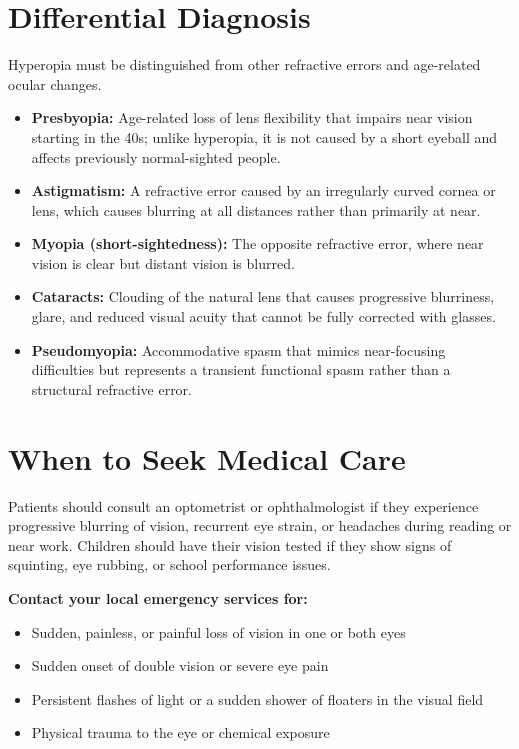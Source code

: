 \section*{Differential Diagnosis}
Hyperopia must be distinguished from other refractive errors and age-related ocular changes.
\begin{itemize}
    \item \textbf{Presbyopia:} Age-related loss of lens flexibility that impairs near vision starting in the 40s; unlike hyperopia, it is not caused by a short eyeball and affects previously normal-sighted people.
    \item \textbf{Astigmatism:} A refractive error caused by an irregularly curved cornea or lens, which causes blurring at all distances rather than primarily at near.
    \item \textbf{Myopia (short-sightedness):} The opposite refractive error, where near vision is clear but distant vision is blurred.
    \item \textbf{Cataracts:} Clouding of the natural lens that causes progressive blurriness, glare, and reduced visual acuity that cannot be fully corrected with glasses.
    \item \textbf{Pseudomyopia:} Accommodative spasm that mimics near-focusing difficulties but represents a transient functional spasm rather than a structural refractive error.
\end{itemize}

\section*{When to Seek Medical Care}
Patients should consult an optometrist or ophthalmologist if they experience progressive blurring of vision, recurrent eye strain, or headaches during reading or near work. Children should have their vision tested if they show signs of squinting, eye rubbing, or school performance issues.

\textbf{Contact your local emergency services for:}
\begin{itemize}
    \item Sudden, painless, or painful loss of vision in one or both eyes
    \item Sudden onset of double vision or severe eye pain
    \item Persistent flashes of light or a sudden shower of floaters in the visual field
    \item Physical trauma to the eye or chemical exposure
\end{itemize}

